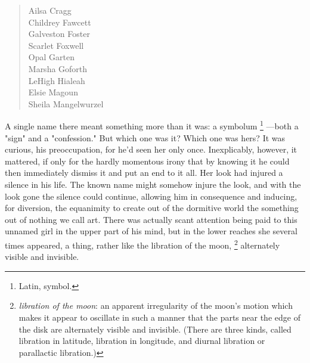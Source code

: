 \begin{verse}
        \hspace{6em} Ailsa Cragg   \\
        \hspace{6em} Childrey Fawcett  \\
        \hspace{6em} Galveston Foster  \\
        \hspace{6em} Scarlet Foxwell   \\
        \hspace{6em} Opal Garten       \\
        \hspace{6em} Marsha Goforth    \\
        \hspace{6em} LeHigh Hialeah    \\
        \hspace{6em} Elsie Magoun      \\
        \hspace{6em} Sheila Mangelwurzel
\end{verse}
 
  A single name there meant something more than it was: a symbolum 
\footnote{ Latin, symbol.}
---both a "sign" and a "confession." But which one was it? Which one was hers? 
It was curious, his preoccupation, for he'd seen her only once. Inexplicably, 
however, it mattered, if only for the hardly momentous irony that by knowing 
it he could then immediately dismiss it and put an end to it all. Her look 
had injured a silence in his life. The known name might somehow injure the 
look, and with the look gone the silence could continue, allowing him in 
consequence and inducing, for diversion, the equanimity 
to create out of the dormitive 
world the something
out of nothing we call art. There was actually scant attention being paid to
this unnamed girl in the upper part of his mind, but in the lower reaches she
several times appeared, a thing, rather like the libration of the moon,
\footnote{\textit{libration of the moon}: an apparent irregularity of the moon's
motion which makes it appear to oscillate in such a manner that the parts near
the edge of the disk are alternately visible and invisible. (There are three
kinds, called libration in latitude, libration in longitude, and diurnal
libration or parallactic libration.) 
}
alternately visible and invisible.


